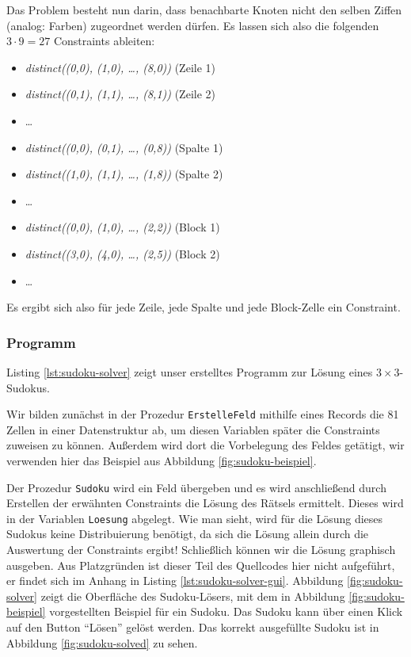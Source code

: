 Das Problem besteht nun darin, dass benachbarte Knoten nicht den selben Ziffen
(analog: Farben) zugeordnet werden dürfen. Es lassen sich also die folgenden $3
\cdot 9 = 27$ Constraints ableiten:

\begin{itemize}
  \item \textsl{distinct((0,0), (1,0), \ldots, (8,0))} (Zeile 1)
  \item \textsl{distinct((0,1), (1,1), \ldots, (8,1))} (Zeile 2)
  \item \ldots
  \item \textsl{distinct((0,0), (0,1), \ldots, (0,8))} (Spalte 1)
  \item \textsl{distinct((1,0), (1,1), \ldots, (1,8))} (Spalte 2)
  \item \ldots
  \item \textsl{distinct((0,0), (1,0), \ldots, (2,2))} (Block 1)
  \item \textsl{distinct((3,0), (4,0), \ldots, (2,5))} (Block 2)
  \item \ldots
\end{itemize}

Es ergibt sich also für jede Zeile, jede Spalte und jede Block-Zelle ein
Constraint. 

\subsubsection{Programm}
Listing \ref{lst:sudoku-solver} zeigt unser erstelltes Programm zur Lösung eines
$3 \times 3$-Sudokus.



Wir bilden zunächst in der Prozedur \texttt{ErstelleFeld} mithilfe eines 
Records die 81 Zellen in einer Datenstruktur ab, um diesen Variablen später die 
Constraints zuweisen zu können. Außerdem wird dort die Vorbelegung des Feldes
getätigt, wir verwenden hier das Beispiel aus Abbildung
\ref{fig:sudoku-beispiel}.

Der Prozedur \texttt{Sudoku} wird ein Feld übergeben und es wird anschließend 
durch Erstellen der erwähnten Constraints die Lösung des Rätsels ermittelt. 
Dieses wird in der Variablen \texttt{Loesung} abgelegt. Wie man sieht, wird für 
die Lösung dieses Sudokus keine Distribuierung benötigt, da sich die Lösung 
allein durch die Auswertung der Constraints ergibt! Schließlich können wir die 
Lösung graphisch ausgeben. Aus Platzgründen ist dieser Teil des Quellcodes hier 
nicht aufgeführt, er findet sich im Anhang in Listing 
\ref{lst:sudoku-solver-gui}. Abbildung \ref{fig:sudoku-solver} zeigt die 
Oberfläche des Sudoku-Lösers, mit dem in Abbildung \ref{fig:sudoku-beispiel} 
vorgestellten Beispiel für ein Sudoku. Das Sudoku kann über einen Klick auf den 
Button "`Lösen"' gelöst werden. Das korrekt ausgefüllte Sudoku ist in Abbildung 
\ref{fig:sudoku-solved} zu sehen.

